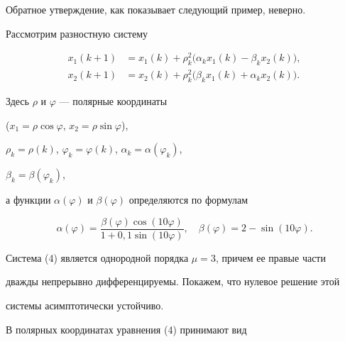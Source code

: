 Обратное утверждение, как показывает следующий пример, неверно.





\begin{exam}


Рассмотрим разностную систему


\begin{equation}


\begin{split}


x_1(k+1)&= x_1(k)+ \rho^2_k \big(\alpha_k x_1(k)-


\beta_k x_2(k) \big),\\


x_2(k+1)&= x_2(k)+ \rho^2_k \big( \beta_k x_1(k)+


\alpha_k x_2(k) \big).


\end{split}


\end{equation}


Здесь $\rho$ и $\varphi$ --- полярные координаты


($x_1= \rho \cos \varphi$, $x_2= \rho \sin \varphi$),


$\rho_k=\rho(k)$, $\varphi_k=\varphi(k)$, $\alpha_k=\alpha(\varphi_k)$,


$\beta_k=\beta(\varphi_k)$,


а функции $\alpha(\varphi)$ и $\beta(\varphi)$ определяются по формулам


$$


\alpha(\varphi)=\frac{\beta(\varphi) \cos(10 \varphi)}{1+0{,}1


\sin(10 \varphi)},\quad


\beta(\varphi)=2-\sin(10 \varphi).


$$ 





Система (4) является однородной порядка $\mu=3$, причем ее правые части


дважды непрерывно дифференцируемы. Покажем, что нулевое решение этой 


системы асимптотически устойчиво.





В полярных координатах уравнения (4) принимают вид


\begin{equation}


\begin{array}{c}



\end{array}
\end{equation}
\end{exam}
